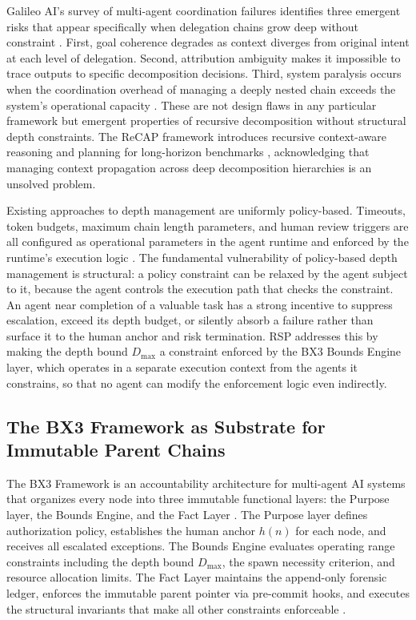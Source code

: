 \documentclass[11pt,oneside]{article}
\begin{document}
Galileo AI's survey of multi-agent coordination failures identifies three emergent risks that appear specifically when delegation chains grow deep without constraint \cite{galileo2025survey}. First, goal coherence degrades as context diverges from original intent at each level of delegation. Second, attribution ambiguity makes it impossible to trace outputs to specific decomposition decisions. Third, system paralysis occurs when the coordination overhead of managing a deeply nested chain exceeds the system's operational capacity \cite{galileo2025survey}. These are not design flaws in any particular framework but emergent properties of recursive decomposition without structural depth constraints. The ReCAP framework introduces recursive context-aware reasoning and planning for long-horizon benchmarks \cite{recap2025arxiv}, acknowledging that managing context propagation across deep decomposition hierarchies is an unsolved problem.

Existing approaches to depth management are uniformly policy-based. Timeouts, token budgets, maximum chain length parameters, and human review triggers are all configured as operational parameters in the agent runtime and enforced by the runtime's execution logic \cite{galileo2025survey}. The fundamental vulnerability of policy-based depth management is structural: a policy constraint can be relaxed by the agent subject to it, because the agent controls the execution path that checks the constraint. An agent near completion of a valuable task has a strong incentive to suppress escalation, exceed its depth budget, or silently absorb a failure rather than surface it to the human anchor and risk termination. RSP addresses this by making the depth bound $D_{\max}$ a constraint enforced by the BX3 Bounds Engine layer, which operates in a separate execution context from the agents it constrains, so that no agent can modify the enforcement logic even indirectly.

\subsection{The BX3 Framework as Substrate for Immutable Parent Chains}\label{sec:bx3-substrate}

The BX3 Framework is an accountability architecture for multi-agent AI systems that organizes every node into three immutable functional layers: the Purpose layer, the Bounds Engine, and the Fact Layer \cite{bx3framework2026,bx3framework,bailoutprotocol2026}. The Purpose layer defines authorization policy, establishes the human anchor $h(n)$ for each node, and receives all escalated exceptions. The Bounds Engine evaluates operating range constraints including the depth bound $D_{\max}$, the spawn necessity criterion, and resource allocation limits. The Fact Layer maintains the append-only forensic ledger, enforces the immutable parent pointer via pre-commit hooks, and executes the structural invariants that make all other constraints enforceable \cite{bx3framework,bailoutprotocol2026}.
\end{document}
